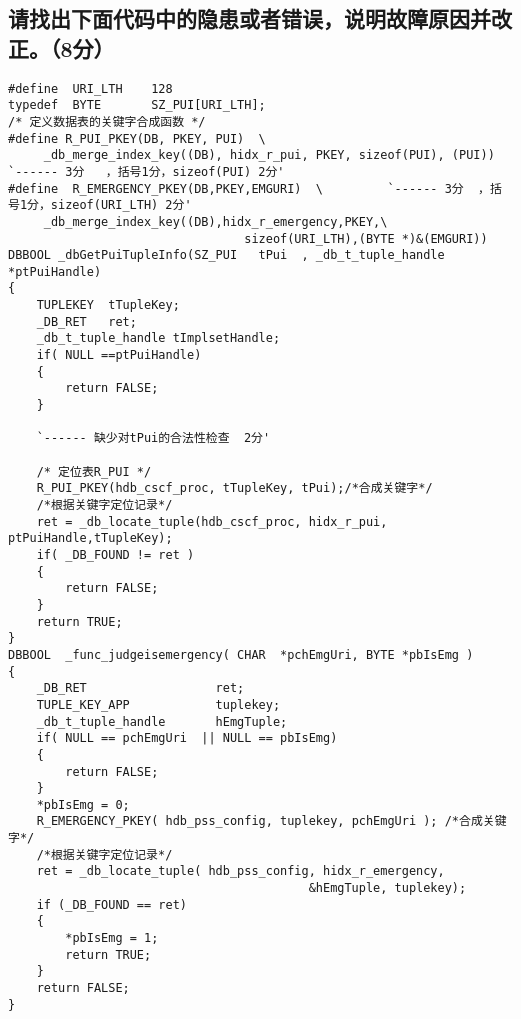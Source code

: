﻿\documentclass  [11pt,onecolumn,a4paper]{article}
\begin{document}
\subsection{请找出下面代码中的隐患或者错误，说明故障原因并改正。（8分）}
\begin{lstlisting}
#define  URI_LTH    128
typedef  BYTE       SZ_PUI[URI_LTH];
/* 定义数据表的关键字合成函数 */
#define R_PUI_PKEY(DB, PKEY, PUI)  \
     _db_merge_index_key((DB), hidx_r_pui, PKEY, sizeof(PUI), (PUI))  `------ 3分   ，括号1分，sizeof(PUI) 2分'
#define  R_EMERGENCY_PKEY(DB,PKEY,EMGURI)  \         `------ 3分  ，括号1分，sizeof(URI_LTH) 2分'
     _db_merge_index_key((DB),hidx_r_emergency,PKEY,\
                                 sizeof(URI_LTH),(BYTE *)&(EMGURI))
DBBOOL _dbGetPuiTupleInfo(SZ_PUI   tPui  , _db_t_tuple_handle *ptPuiHandle)
{
    TUPLEKEY  tTupleKey;
    _DB_RET   ret;
    _db_t_tuple_handle tImplsetHandle;
    if( NULL ==ptPuiHandle)
    {
        return FALSE;
    }

    `------ 缺少对tPui的合法性检查  2分'

    /* 定位表R_PUI */
    R_PUI_PKEY(hdb_cscf_proc, tTupleKey, tPui);/*合成关键字*/
    /*根据关键字定位记录*/    
    ret = _db_locate_tuple(hdb_cscf_proc, hidx_r_pui, ptPuiHandle,tTupleKey);
    if( _DB_FOUND != ret )
    {
        return FALSE;
    }
    return TRUE;
}
DBBOOL  _func_judgeisemergency( CHAR  *pchEmgUri, BYTE *pbIsEmg )
{
    _DB_RET                  ret;
    TUPLE_KEY_APP            tuplekey;
    _db_t_tuple_handle       hEmgTuple;
    if( NULL == pchEmgUri  || NULL == pbIsEmg)
    {
        return FALSE;  
    }   
    *pbIsEmg = 0;   
    R_EMERGENCY_PKEY( hdb_pss_config, tuplekey, pchEmgUri ); /*合成关键字*/
    /*根据关键字定位记录*/
    ret = _db_locate_tuple( hdb_pss_config, hidx_r_emergency, 
                                          &hEmgTuple, tuplekey); 
    if (_DB_FOUND == ret)
    {
        *pbIsEmg = 1;
        return TRUE;
    }
    return FALSE;  
}
\end{lstlisting}
\end{document}
